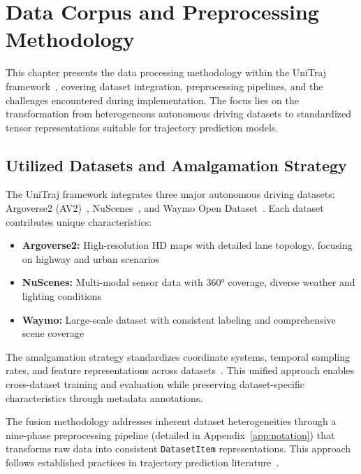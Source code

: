 \chapter{Data Corpus and Preprocessing Methodology}
\label{ch:data_methodology}

This chapter presents the data processing methodology within the UniTraj framework~\cite{unitrajFeng2024}, covering dataset integration, preprocessing pipelines, and the challenges encountered during implementation. The focus lies on the transformation from heterogeneous autonomous driving datasets to standardized tensor representations suitable for trajectory prediction models.

\section{Utilized Datasets and Amalgamation Strategy}
\label{sec:data_datasets}

The UniTraj framework integrates three major autonomous driving datasets: Argoverse2 (AV2)~\cite{av2Wilson2023}, NuScenes~\cite{caesar2020nuscenes}, and Waymo Open Dataset~\cite{wmodSun2020}. Each dataset contributes unique characteristics:

\begin{itemize}
    \item \textbf{Argoverse2:} High-resolution HD maps with detailed lane topology, focusing on highway and urban scenarios
    \item \textbf{NuScenes:} Multi-modal sensor data with 360° coverage, diverse weather and lighting conditions
    \item \textbf{Waymo:} Large-scale dataset with consistent labeling and comprehensive scene coverage
\end{itemize}

The amalgamation strategy standardizes coordinate systems, temporal sampling rates, and feature representations across datasets~\cite{VectorNet2020, Shi2022MTR}. This unified approach enables cross-dataset training and evaluation while preserving dataset-specific characteristics through metadata annotations.

The fusion methodology addresses inherent dataset heterogeneities through a nine-phase preprocessing pipeline (detailed in Appendix~\ref{app:notation}) that transforms raw data into consistent \texttt{DatasetItem} representations. This approach follows established practices in trajectory prediction literature~\cite{zhou2022hivt, qcnetZhou2023, Shi2023MTRplusplus}.

